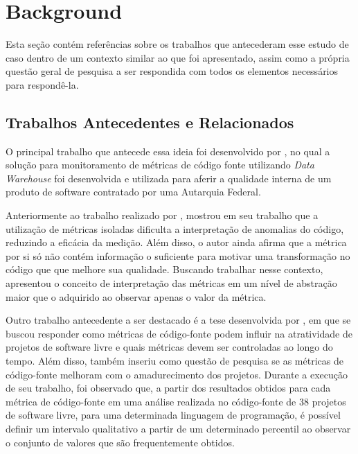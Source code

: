 \section{Background}\label{sec:Background}

Esta seção contém referências sobre os trabalhos que antecederam esse estudo de caso dentro de um contexto similar ao que foi apresentado, assim como a própria questão geral de pesquisa a ser respondida com todos os elementos necessários para respondê-la.

\subsection{Trabalhos Antecedentes e Relacionados}

O principal trabalho que antecede essa ideia foi desenvolvido por , no qual a solução para monitoramento de métricas de código fonte utilizando \textit{Data Warehouse} foi desenvolvida e utilizada para aferir a qualidade interna de um produto de software contratado por uma Autarquia Federal.

Anteriormente ao trabalho realizado por ,  mostrou em seu trabalho que a utilização de métricas isoladas dificulta a interpretação de anomalias do código, reduzindo a eficácia da medição. Além disso, o autor ainda afirma que a métrica por si só não contém informação o suficiente para motivar uma transformação no código que que melhore sua qualidade. Buscando trabalhar nesse contexto,  apresentou o conceito de interpretação das métricas em um nível de abstração maior que o adquirido ao observar apenas o valor da métrica.

Outro trabalho antecedente a ser destacado é a tese desenvolvida por , em que se buscou responder como métricas de código-fonte podem influir na atratividade de projetos de software livre e quais métricas devem ser controladas ao longo do tempo. Além disso,  também inseriu como questão de pesquisa se as métricas de código-fonte melhoram com o amadurecimento dos projetos. Durante a execução de seu trabalho, foi observado que, a partir dos resultados obtidos para cada métrica de
código-fonte em uma análise realizada no código-fonte de 38 projetos de software livre, para uma determinada linguagem de programação, é possível definir um intervalo qualitativo a partir de um determinado percentil ao observar o conjunto de valores que são frequentemente obtidos.

